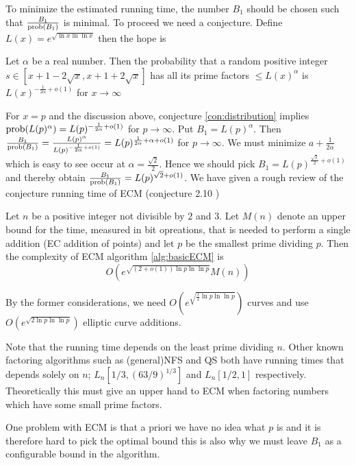 To minimize the estimated running time, the number $B_1$ should be chosen such that $\frac{B_1}{\text{prob}(B_1)}$ is minimal. To proceed we need a conjecture. Define $L(x)=e^{\sqrt{\ln x\ln\ln x}}$ then the hope is
\begin{con}\label{con:distribution}
Let $\alpha$ be a real number. Then the probability that a random positive integer $s\in [x+1-2\sqrt{x},x+1+2\sqrt{x}]$ has all its prime factors $\leq L(x)^\alpha$ is $L(x)^{-\frac{1}{2\alpha}+o(1)}$ for $x\rightarrow \infty$
\end{con}
For $x=p$ and the discussion above, conjecture \ref{con:distribution} implies $\text{prob}(L(p)^\alpha)=L(p)^{-\frac{1}{2\alpha}+o(1)}$ for $p\rightarrow \infty$. Put $B_1=L(p)^\alpha$. Then $\frac{B_1}{\text{prob}(B_1)}=\frac{L(p)^\alpha}{L(p)^{-\frac{1}{2\alpha}+o(1)}}=L(p)^{\frac{1}{2\alpha}+\alpha+o(1)}$ for $p\rightarrow\infty$. We must minimize $a+\frac{1}{2\alpha}$ which is easy to see occur at $\alpha=\frac{\sqrt{2}}{2}$. Hence we should pick $B_1=L(p)^{\frac{\sqrt{2}}{2}+o(1)}$ and thereby obtain $\frac{B_1}{\text{prob}(B_1)}=L(p)^{\sqrt{2}+o(1)}$. We have given a rough review of the conjecture running time of ECM (conjecture 2.10 \cite{lenstra1987})
\begin{con}
Let $n$ be a positive integer not divisible by $2$ and $3$. Let $M(n)$ denote an upper bound for the time, measured in bit opreations, that is needed to perform a single addition (EC addition of points) and let $p$ be the smallest prime dividing $p$. Then the complexity of ECM algorithm \ref{alg:basicECM} is
\[
	O\left(e^{\sqrt{(2+o(1))\ln p\ln\ln p}}M(n)\right)
\]
\end{con}
\begin{rem}\label{rem:theory}
By the former considerations, we need $O\left(e^{\sqrt{\frac{1}{2}\ln p\ln\ln p}}\right)$ curves and use $O\left(e^{\sqrt{2\ln p\ln\ln p}}\right)$ elliptic curve additions.
\end{rem}
Note that the running time depends on the least prime dividing $n$. Other known factoring algorithms such as (general)NFS and QS both have running times that depends solely on $n$; $L_n[1/3,(63/9)^{1/3}]$ and $L_n[1/2,1]$ respectively. Theoretically this must give an upper hand to ECM when factoring numbers which have some small prime factors.

One problem with ECM is that a priori we have no idea what $p$ is and it is therefore hard to pick the optimal bound this is also why we must leave $B_1$ as a configurable bound in the algorithm. 
